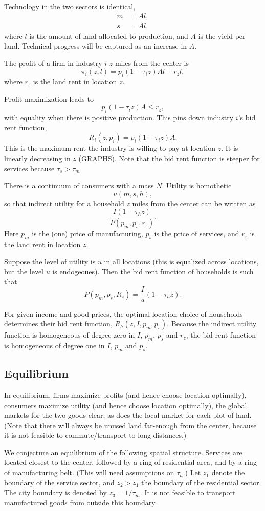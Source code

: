\documentclass{amsart}
\theoremstyle{definition}
\theoremstyle{remark}
\numberwithin{equation}{section}
\begin{document}
Technology in the two sectors is identical,
\begin{align*}
m&=Al,\\
s&=Al,
\end{align*}
where $l$ is the amount of land allocated to production, and $A$ is the yield per land. Technical progress will be captured as an increase in $A$.

The profit of a firm in industry $i$ $z$ miles from the center is 
\[
\pi_i(z,l) = p_i(1-\tau_i z)Al - r_zl,
\]
where $r_z$ is the land rent in location $z$. 

Profit maximization leads to
\[
p_i(1-\tau_i z)A \le r_z,
\]
with equality when there is positive production. This pins down industry $i$'s bid rent function,
\[
R_i(z,p_i) = p_i(1-\tau_i z)A.
\]
This is the maximum rent the industry is willing to pay at location $z$. It is linearly decreasing in $z$ (GRAPHS). Note that the bid rent function is steeper for services because $\tau_s>\tau_m$.


There is a continuum of consumers with a mass $N$. Utility is homothetic
\[
u(m,s,h),
\]
so that indirect utility for a household $z$ miles from the center can be written as
\[
\frac{I(1-\tau_hz)}{P(p_m,p_s,r_z)}.
\]
Here $p_m$ is the (one) price of manufacturing, $p_s$ is the price of services, and $r_z$ is the land rent in location $z$.

Suppose the level of utility is $u$ in all locations (this is equalized across locations, but the level $u$ is endogeoues). Then the bid rent function of households is such that
\[
P(p_m,p_s,R_z) = \frac Iu (1-\tau_h z).
\]

For given income and good prices, the optimal location choice of households determines their bid rent function, $R_h(z,I,p_m,p_s)$. Because the indirect utility function is homogeneous of degree zero in $I$, $p_m$, $p_s$ and $r_z$, the bid rent function is homogeneous of degree one in $I$, $p_m$ and $p_s$.
\subsection{Equilibrium}
In equilibrium, firms maximize profits (and hence choose location optimally), consumers maximize utility (and hence choose location optimally), the global markets for the two goods clear, as does the local market for each plot of land. (Note that there will always be unused land far-enough from the center, because it is not feasible to commute/transport to long distances.)

We conjecture an equilibrium of the following spatial structure. Services are located closest to the center, followed by a ring of residential area, and by a ring of manufacturing belt. (This will need assumptions on $\tau_h$.) Let $z_1$ denote the boundary of the service sector, and $z_2>z_1$ the boundary of the residential sector. The city boundary is denoted by $z_3 = 1/\tau_m$. It is not feasible to transport manufactured goods from outside this boundary.
\end{document}

